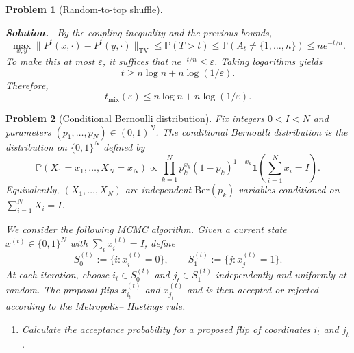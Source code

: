 \documentclass[11pt]{article}
\newtheorem{problem}{Problem}
\newenvironment{solution}{\par\noindent\textbf{Solution.}\ }{\par}
\begin{document}
\begin{problem}[Random-to-top shuffle]
\begin{enumerate}
\begin{solution}
By the coupling inequality and the previous bounds,
\[
  \max_{x,y} \|P^t(x,\cdot) - P^t(y,\cdot)\|_{\mathrm{TV}}
  \le \mathbb{P}(T>t)
  \le \mathbb{P}(A_t \neq \{1,\dots,n\})
  \le n e^{-t/n}.
\]
To make this at most $\varepsilon$, it suffices that $n e^{-t/n} \le \varepsilon$.
Taking logarithms yields
\[
  t \ge n\log n + n\log(1/\varepsilon).
\]
Therefore,
\[
  t_{\mathrm{mix}}(\varepsilon) \le n\log n + n\log(1/\varepsilon).
\]
\qedhere
\end{solution}

\end{enumerate}
\end{problem}

\bigskip

\begin{problem}[Conditional Bernoulli distribution]
Fix integers $0 < I < N$ and parameters $(p_1,\dots,p_N) \in (0,1)^N$. The
conditional Bernoulli distribution is the distribution on $\{0,1\}^N$ defined by
\[
  \mathbb{P}(X_1 = x_1,\dots,X_N = x_N)
  \propto \prod_{k=1}^N p_k^{x_k}(1-p_k)^{1-x_k}
  \mathbf{1}\!\left(\sum_{i=1}^N x_i = I\right).
\]
Equivalently, $(X_1,\dots,X_N)$ are independent $\mathrm{Ber}(p_k)$ variables
conditioned on $\sum_{i=1}^N X_i = I$.

We consider the following MCMC algorithm. Given a current state $x^{(t)} \in
\{0,1\}^N$ with $\sum_i x^{(t)}_i = I$, define
\[
  S_0^{(t)} := \{i : x^{(t)}_i = 0\}, \qquad
  S_1^{(t)} := \{j : x^{(t)}_j = 1\}.
\]
At each iteration, choose $i_t \in S_0^{(t)}$ and $j_t \in S_1^{(t)}$
independently and uniformly at random. The proposal flips $x^{(t)}_{i_t}$ and
$x^{(t)}_{j_t}$ and is then accepted or rejected according to the Metropolis–
Hastings rule.

\begin{enumerate}
\item Calculate the acceptance probability for a proposed flip of coordinates
$i_t$ and $j_t$.


\end{enumerate}
\end{problem}
\end{document}
